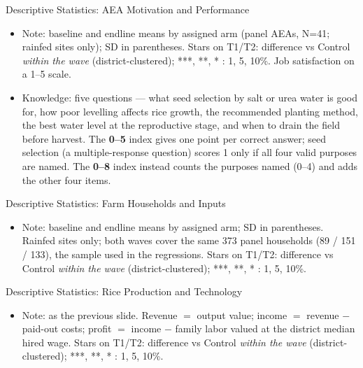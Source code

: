 \documentclass[aspectratio=169]{beamer}
\newcommand{\notefont}{\fontsize{5pt}{6pt}\selectfont}
\begin{document}
\begin{frame}{Descriptive Statistics: AEA Motivation and Performance}
	\centering
	\begin{itemize}\notefont
		\item Note: baseline and endline means by assigned arm (panel AEAs, N=41; rainfed sites only); SD in
		parentheses. Stars on T1/T2: difference vs Control \emph{within the wave}
		(district-clustered); ***, **, * : 1, 5, 10\%. Job satisfaction on a 1--5 scale.
		\item Knowledge: five questions --- what seed selection by salt or urea water is good for, how poor levelling affects rice growth, the recommended planting method, the best water level at the reproductive stage, and when to drain the field before harvest.
		The \textbf{0--5} index gives one point per correct answer; seed selection (a multiple-response question) scores 1 only if all four valid purposes are named. The \textbf{0--8} index instead counts the purposes named (0--4) and adds the other four items.
	\end{itemize}
\end{frame}

\begin{frame}{Descriptive Statistics: Farm Households and Inputs}
	\centering
	\begin{itemize}\notefont
		\item Note: baseline and endline means by assigned arm; SD in parentheses. Rainfed sites
		only; both waves cover the same 373 panel households (89 / 151 / 133), the sample used
		in the regressions.
		Stars on T1/T2: difference vs Control
		\emph{within the wave} (district-clustered); ***, **, * : 1, 5, 10\%.
	\end{itemize}
\end{frame}

\begin{frame}{Descriptive Statistics: Rice Production and Technology}
	\centering
	\begin{itemize}\notefont
		\item Note: as the previous slide. Revenue $=$ output value; income $=$ revenue $-$
		paid-out costs; profit $=$ income $-$ family labor valued at the district median hired
		wage. Stars on T1/T2: difference vs Control \emph{within the wave} (district-clustered);
		***, **, * : 1, 5, 10\%.
	\end{itemize}
\end{frame}
\end{document}
